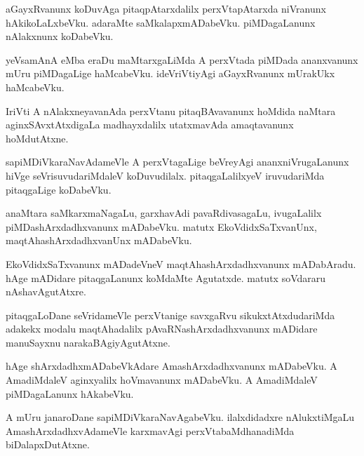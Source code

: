 \documentclass{article}
\begin{document}
\begin{mn}%
aGayxRvanunx koDuvAga pitaqpAtarxdalilx perxVtapAtarxda niVranunx
hAkikoLaLxbeVku. adaraMte saMkalapxmADabeVku. piMDagaLanunx nAlakxnunx koDabeVku.
\end{mn}

\begin{mn}
yeVsamAnA eMba eraDu maMtarxgaLiMda A perxVtada piMDada ananxvanunx
mUru piMDagaLige haMcabeVku. ideVriVtiyAgi aGayxRvanunx mUrakUkx haMcabeVku.
\end{mn}

\begin{mn}
IriVti A nAlakxneyavanAda perxVtanu pitaqBAvavanunx hoMdida naMtara
aginxSAvxtAtxdigaLa madhayxdalilx utatxmavAda amaqtavanunx hoMdutAtxne.
\end{mn}

\begin{mn}
sapiMDiVkaraNavAdameVle A perxVtagaLige beVreyAgi ananxniVrugaLanunx
hiVge seVrisuvudariMdaleV koDuvudilalx. pitaqgaLalilxyeV iruvudariMda
pitaqgaLige koDabeVku.
\end{mn}

\begin{mn}
anaMtara saMkarxmaNagaLu, garxhavAdi pavaRdivasagaLu, ivugaLalilx
piMDashArxdadhxvanunx mADabeVku. matutx EkoVdidxSaTxvanUnx,
maqtAhashArxdadhxvanUnx mADabeVku.
\end{mn}

\begin{mn}%
EkoVdidxSaTxvanunx mADadeVneV maqtAhashArxdadhxvanunx mADabAradu. hAge
mADidare pitaqgaLanunx koMdaMte Agutatxde. matutx soVdararu nAshavAgutAtxre.
\end{mn}

\begin{mn}
pitaqgaLoDane seVridameVle perxVtanige savxgaRvu sikukxtAtxdudariMda
adakekx modalu maqtAhadalilx pAvaRNashArxdadhxvanunx mADidare
manuSayxnu narakaBAgiyAgutAtxne.
\end{mn}

\begin{mn}
hAge shArxdadhxmADabeVkAdare AmashArxdadhxvanunx mADabeVku. A
AmadiMdaleV aginxyalilx hoVmavanunx mADabeVku. A AmadiMdaleV
piMDagaLanunx hAkabeVku.
\end{mn}

\begin{mn}%
A mUru janaroDane sapiMDiVkaraNavAgabeVku. ilalxdidadxre nAlukxtiMgaLu
AmashArxdadhxvAdameVle karxmavAgi perxVtabaMdhanadiMda biDalapxDutAtxne.
\end{mn}
\end{document}
